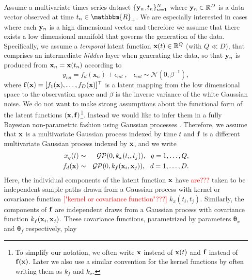 \documentclass{article} %
\begin{document}
Assume a multivariate times series dataset $\{\mathbf{y}_n,t_n\}_{n=1}^N$
where $\mathbf{y}_n \in \mathbb{R}^D$ is a data vector observed at time 
$t_n \in \mathbbm{R}_+$. We are especially interested in cases where each 
$\mathbf{y}_n$ is a high dimensional vector 
and therefore we assume that there exists a
low dimensional manifold that governs the generation of the data. 
Specifically, we assume a {\em temporal} latent
function $\mathbf{x}(t) \in \mathbb{R}^Q$ (with $Q \ll D$), 
that comprises an intermediate {\em hidden} layer when generating the
data, so that $\mathbf{y}_n$ is produced from $\mathbf{x}_n = \mathbf{x}(t_n)$
according to      
\begin{equation}
\label{generative}
\mathit{y_{nd}} = f_d(\mathbf{x}_n) + \epsilon_{nd} \;, \;\;\; \epsilon_{nd} \sim \mathcal{N}(0, \beta^{-1}),
\end{equation}
where $\mathbf{f}(\mathbf{x}) = [f_1(\mathbf{x}), \ldots, f_D(\mathbf{x})]^{\top}$
is a latent mapping from the low dimensional space to the observation space
and $\beta$ is the inverse variance of the white Gaussian noise. 
We do not want to make strong assumptions about the 
functional form of the latent functions $(\mathbf{x}, \mathbf{f})$\footnote{To
simplify our notation, we often write $\mathbf{x}$ instead of $\mathbf{x}(t)$
and $\mathbf{f}$ instead of $\mathbf{f}(\mathbf{x})$. Later we also use a similar 
convention for the kernel functions by often writing them as $\mathit{k}_f$ and
$\mathit{k}_x$.}. Instead 
we would like to infer them in a fully Bayesian non-parametric
fashion using Gaussian processes \cite{rasmussen-williams}.
Therefore, we assume that $\mathbf{x}$ is a multivariate Gaussian process 
indexed by time $t$ and $\mathbf{f}$ is a different multivariate 
Gaussian process indexed by $\mathbf{x}$, and we write 
\begin{eqnarray}
x_q(t)  & \sim & \mathcal{GP}(0, k_x(t_i,t_j)), \ \ q=1,\ldots,Q, \\     
f_d(\bfx)  & \sim & \mathcal{GP}(0, k_f(\bfx_i,\bfx_j)), \ \ d=1,\ldots,D.
\label{eq:GPpriors}
\end{eqnarray}
Here, the individual components of the latent function $\mathbf{x}$ 
have \textcolor{red}{are???} taken to be independent sample paths drawn from a Gaussian process with kernel or covariance function 
\textcolor{red}{["kernel or covariance function"???]}
$k_x(t_i,t_j)$. Similarly, the components of $\mathbf{f}$ are independent 
draws from a Gaussian process with covariance function $k_f(\mathbf{x}_i,\mathbf{x}_j)$. 
These covariance functions, parametrized by parameters 
$\boldsymbol \theta_x$ and $\boldsymbol \theta_f$ respectively,  play 
\end{document}
